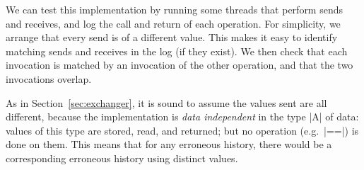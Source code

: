 We can test this implementation by running some threads that perform sends and
receives, and log the call and return of each operation.  For simplicity, we
arrange that every send is of a different value.  This makes it easy to
identify matching sends and receives in the log (if they exist).  We then check
that each invocation is matched by an invocation of the other operation, and
that the two invocations overlap.

As in Section~\ref{sec:exchanger}, it is sound to assume the values sent are
all different, because the implementation is \emph{data
  independent} in the type |A| of data: values of
this type are stored, read, and returned; but no operation (e.g.~|==|) is done
on them.  This means that for any erroneous history, there would be a
corresponding erroneous history using distinct values.

